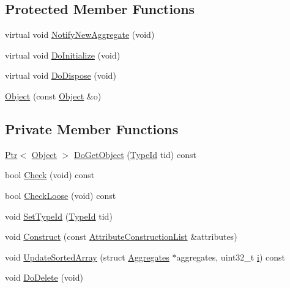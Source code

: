 \subsection*{Protected Member Functions}
\begin{DoxyCompactItemize}
\item 
virtual void \hyperlink{classns3_1_1Object_a1bd7211125185a6cd511c35fea4e500f}{Notify\+New\+Aggregate} (void)
\item 
virtual void \hyperlink{classns3_1_1Object_af8482a521433409fb5c7f749398c9dbe}{Do\+Initialize} (void)
\item 
virtual void \hyperlink{classns3_1_1Object_a475d429a75d302d4775f4ae32479b287}{Do\+Dispose} (void)
\item 
\hyperlink{classns3_1_1Object_a99be7263a1ee29bfd8114523e072a74a}{Object} (const \hyperlink{classns3_1_1Object}{Object} \&o)
\end{DoxyCompactItemize}
\subsection*{Private Member Functions}
\begin{DoxyCompactItemize}
\item 
\hyperlink{classns3_1_1Ptr}{Ptr}$<$ \hyperlink{classns3_1_1Object}{Object} $>$ \hyperlink{classns3_1_1Object_a3ee161b5ced0991bcb0a7aef2f6645f1}{Do\+Get\+Object} (\hyperlink{classns3_1_1TypeId}{Type\+Id} tid) const 
\item 
bool \hyperlink{classns3_1_1Object_a7e7f89fb0a81d0189cbcacee64b67e4e}{Check} (void) const 
\item 
bool \hyperlink{classns3_1_1Object_a0236cc5b512a7de2aeb4e42f53f23432}{Check\+Loose} (void) const 
\item 
void \hyperlink{classns3_1_1Object_a19b1ebd8ec8fe404845e665880a6c5ad}{Set\+Type\+Id} (\hyperlink{classns3_1_1TypeId}{Type\+Id} tid)
\item 
void \hyperlink{classns3_1_1Object_a636e8411dc5228771f45c9b805d348fa}{Construct} (const \hyperlink{classns3_1_1AttributeConstructionList}{Attribute\+Construction\+List} \&attributes)
\item 
void \hyperlink{classns3_1_1Object_adb379c50ccca82c52a2973be4722be84}{Update\+Sorted\+Array} (struct \hyperlink{structns3_1_1Object_1_1Aggregates}{Aggregates} $\ast$aggregates, uint32\+\_\+t \hyperlink{lte__uplink__power__control_8m_a6f6ccfcf58b31cb6412107d9d5281426}{i}) const 
\item 
void \hyperlink{classns3_1_1Object_a757cb898d51f92239be9d1309d16a972}{Do\+Delete} (void)
\end{DoxyCompactItemize}
